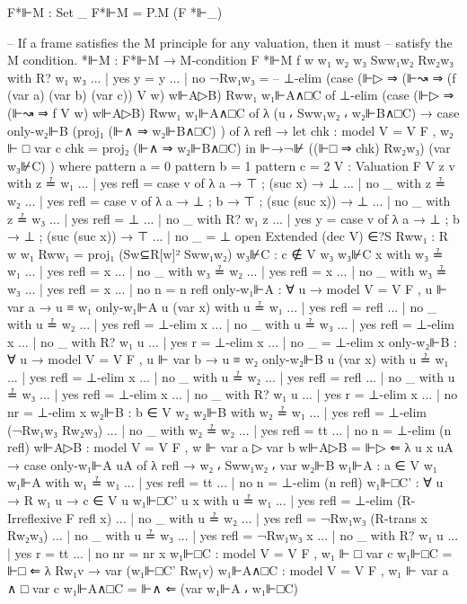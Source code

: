 \begin{spverbatim}
  F*⊩M : Set _
  F*⊩M = P.M (F *⊩_)

  -- If a frame satisfies the M principle for any valuation, then it must
  -- satisfy the M condition.
  *⊩M : F*⊩M → M-condition F
  *⊩M f {w} {w₁} {w₂} {w₃} Sww₁w₂ Rw₂w₃ with R? w₁ w₃
  ... | yes y = y
  ... | no ¬Rw₁w₃ =
    -- ⊥-elim (case (⊩▷ ⇒ (⊩↝ ⇒ (f (var a) (var b) (var c)) V w) w⊩A▷B) Rww₁ w₁⊩A∧□C of
    ⊥-elim (case (⊩▷ ⇒ (⊩↝ ⇒ f V w) w⊩A▷B) Rww₁ w₁⊩A∧□C of
    λ { (u ⸴ Sww₁w₂ ⸴ w₂⊩B∧□C) → case only-w₂⊩B (proj₁ (⊩∧ ⇒ w₂⊩B∧□C) ) of
    λ {refl →  let chk : model {V = V} F , w₂ ⊩ □ var c
                   chk = proj₂ (⊩∧ ⇒ w₂⊩B∧□C)
                in ⊩→¬⊮ ((⊩□ ⇒ chk) Rw₂w₃) (var w₃⊮C)}
    })
    where
    pattern a = 0
    pattern b = 1
    pattern c = 2
    V : Valuation F
    V z v with z ≟ w₁
    ... | yes refl = case v of λ { a → ⊤ ; (suc x) → ⊥}
    ... | no _ with z ≟ w₂
    ... | yes refl = case v of λ { a → ⊥ ; b → ⊤ ; (suc (suc x)) → ⊥}
    ... | no _ with z ≟ w₃
    ... | yes refl = ⊥
    ... | no _ with R? w₁ z
    ... | yes y = case v of λ {a → ⊥ ; b → ⊥ ; (suc (suc x)) → ⊤}
    ... | no _ = ⊥
    open Extended (dec V) ∈?S
    Rww₁ : R w w₁
    Rww₁ = proj₁ (Sw⊆R[w]² Sww₁w₂)
    w₃⊮C : c ∉ V w₃
    w₃⊮C x with w₃ ≟ w₁
    ... | yes refl = x
    ... | no _ with w₃ ≟ w₂
    ... | yes refl = x
    ... | no _ with w₃ ≟ w₃
    ... | yes refl = x
    ... | no n = n refl
    only-w₁⊩A : ∀ {u} → model {V = V} F , u ⊩ var a → u ≡ w₁
    only-w₁⊩A {u} (var x) with u ≟ w₁
    ... | yes refl = refl
    ... | no _ with u ≟ w₂
    ... | yes refl = ⊥-elim x
    ... | no _ with u ≟ w₃
    ... | yes refl = ⊥-elim x
    ... | no _ with R? w₁ u
    ... | yes r = ⊥-elim x
    ... | no _ = ⊥-elim x
    only-w₂⊩B : ∀ {u} → model {V = V} F , u ⊩ var b → u ≡ w₂
    only-w₂⊩B {u} (var x) with u ≟ w₁
    ... | yes refl = ⊥-elim x
    ... | no _ with u ≟ w₂
    ... | yes refl = refl
    ... | no _ with u ≟ w₃
    ... | yes refl = ⊥-elim x
    ... | no _ with R? w₁ u
    ... | yes r = ⊥-elim x
    ... | no nr = ⊥-elim x
    w₂⊩B : b ∈ V w₂
    w₂⊩B with w₂ ≟ w₁
    ... | yes refl = ⊥-elim (¬Rw₁w₃ Rw₂w₃)
    ... | no _ with w₂ ≟ w₂
    ... | yes refl = tt
    ... | no n = ⊥-elim (n refl)
    w⊩A▷B : model {V = V} F , w ⊩ var a ▷ var b
    w⊩A▷B = ⊩▷ ⇐ λ {u} x uA → case only-w₁⊩A uA of λ { refl → w₂ ⸴ Sww₁w₂ ⸴ var w₂⊩B}
    w₁⊩A : a ∈ V w₁
    w₁⊩A with w₁ ≟ w₁
    ... | yes refl = tt
    ... | no n = ⊥-elim (n refl)
    w₁⊩□C' : ∀ {u} → R w₁ u → c ∈ V u
    w₁⊩□C' {u} x with u ≟ w₁
    ... | yes refl = ⊥-elim (R-Irreflexive F refl x)
    ... | no _ with u ≟ w₂
    ... | yes refl = ¬Rw₁w₃ (R-trans x Rw₂w₃)
    ... | no _ with u ≟ w₃
    ... | yes refl = ¬Rw₁w₃ x
    ... | no _ with R? w₁ u
    ... | yes r = tt
    ... | no nr = nr x
    w₁⊩□C : model {V = V} F , w₁ ⊩ □ var c
    w₁⊩□C = ⊩□ ⇐ λ Rw₁v → var (w₁⊩□C' Rw₁v)
    w₁⊩A∧□C : model {V = V} F , w₁ ⊩ var a ∧ □ var c
    w₁⊩A∧□C = ⊩∧ ⇐ (var w₁⊩A ⸴ w₁⊩□C)
\end{spverbatim}
